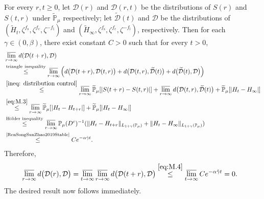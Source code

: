 \documentclass{amse-new}
\numberwithin{equation}{section}
\begin{document}
\begin{prof}
	For every $r,t\geq 0$, let $\mathcal D(r)$ and $\mathcal D(r,t)$ be the distributions of $S(r)$ and $S(t,r)$ under $\widetilde{\mathbb P}_{\mu}$ respectively;
	let $\widetilde{\mathcal D}(t)$ and $\mathcal D$ be the distributions of $(\widetilde H_t,\zeta^{f_\mathrm s},\zeta^{f_\mathrm c},\zeta^{-f_\mathrm l})$ and $(\widetilde H_\infty,\zeta^{f_\mathrm s},\zeta^{f_\mathrm c},\zeta^{-f_\mathrm l})$, respectively.
	Then for each $\gamma\in (0,\beta)$, there exist constant $C>0$ such that for every $t > 0$,
\begin{align}
 	&\varlimsup_{r\rightarrow \infty}d(\mathcal D(t+r),\mathcal D)
 	\\& \overset{\rm triangle~inequality}\leq \varlimsup_{r\rightarrow \infty}\Big( d\big(\mathcal D(t+r),\mathcal D(t,r)\big)+d\big(\mathcal D(t,r),\widetilde{\mathcal D}(t)\big)+d\big(\widetilde{\mathcal D}(t),\mathcal D\big)\Big)
 	\\&\overset{\eqref{ineq: distribution control}} \leq \varlimsup_{r\rightarrow \infty}\widetilde{\mathbb P}_{\mu}[|S(t+r) - S(t,r)|]+ \varlimsup_{r\rightarrow \infty} d\big(\mathcal D(t,r),\widetilde{\mathcal D}(t)\big) +\widetilde{\mathbb P}_{\mu}[|H_t-H_{\infty}|]
	\\&\overset{\eqref{eq:M.3}}\leq \varlimsup_{r\rightarrow \infty}\widetilde{\mathbb P}_{\mu}[|H_t - H_{t+r}|]+\widetilde{\mathbb P}_{\mu}[|H_t-H_{\infty}|]
  	\\&\overset{\text{H\"older inequality}}\leq \varlimsup_{r\rightarrow \infty}\mathbb P_{\mu}(D^c)^{-1}(\|H_t-H_{t+r}\|_{L_{1+\gamma} (\mathbb P_\mu)}+\|H_t-H_{\infty}\|_{L_{1+\gamma} (\mathbb P_\mu)})
	\\&\label{eq:M.4}\overset{\text{\cite[Lemma 3.3]{RenSongSunZhao2019Stable}}}\leq C e^{-\alpha \tilde \gamma t}.
\end{align}
	Therefore,
\begin{align}
 	&\varlimsup_{r\rightarrow \infty}d\big(\mathcal D(r),\mathcal D\big)
 	=\varlimsup_{t\to \infty}\varlimsup_{r\rightarrow \infty}d\big(\mathcal D(t+r),\mathcal D\big)
	\overset{\eqref{eq:M.4}}\leq \varlimsup_{t\rightarrow \infty}Ce^{-\alpha \tilde \gamma t} = 0.
\end{align}
	The desired result now follows immediately.


\end{prof}
\end{document}
